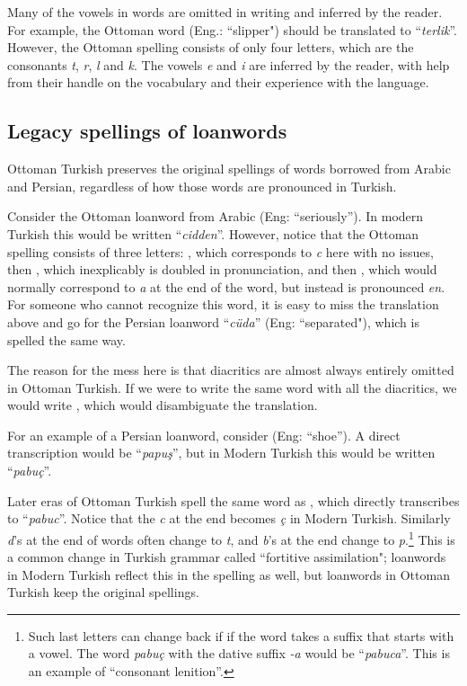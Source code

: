\documentclass[10pt,twocolumn]{article}
\theoremstyle{nonumberplain}
\newcommand{\otto}[1]{\RLE{\ottoman{}\Large{}#1}}
\newcommand{\word}[1]{``\emph{#1}''}
\begin{document}
Many of the vowels in words are omitted in writing and inferred by the reader.
For example, the Ottoman word \otto{ترلك} (Eng.: ``slipper") should be
translated to \word{terlik}.
However, the Ottoman spelling consists of only four letters, which are the
consonants \emph{t}, \emph{r}, \emph{l} and \emph{k}.
The vowels \emph{e} and \emph{i} are inferred by the reader, with help from
their handle on the vocabulary and their experience with the language.

\subsection{Legacy spellings of loanwords}

Ottoman Turkish preserves the original spellings of words borrowed from
Arabic and Persian, regardless of how those words are pronounced in Turkish.

Consider the Ottoman loanword from Arabic \otto{جدا} (Eng: ``seriously''). In
modern Turkish this would be written \word{cidden}. However, notice that the
Ottoman spelling consists of three letters: \otto{ج}, which corresponds to
\emph{c} here with no issues, then \otto{د}, which inexplicably is doubled in
pronunciation, and then \otto{ا}, which would normally correspond to
\emph{a} at the end of the word, but instead is pronounced \emph{en}.
For someone who cannot recognize this word, it is easy to miss the translation above and go for
the Persian loanword \word{cüda} (Eng: ``separated"), which is spelled the same way.

The reason for the mess here is that diacritics are almost always entirely omitted in Ottoman Turkish.
If we were to write the same word with all the diacritics, we would write
\otto{جِدًّا}, which would disambiguate the translation.

For an example of a Persian loanword, consider \otto{پاپوش} (Eng: ``shoe'').
A direct transcription would be \word{papuş},
but in Modern Turkish this would be written \word{pabuç}.

Later eras of Ottoman Turkish spell the same word as \otto{پابوج}, which
directly transcribes to \word{pabuc}. Notice that the \emph{c} at the end becomes
\emph{ç} in Modern Turkish. Similarly \emph{d}'s at the end of words
often change to \emph{t}, and \emph{b}'s at the end change to
\emph{p}.\footnote{Such last letters can change back if if the word takes a
suffix that starts with a vowel. The word \emph{pabuç} with the dative suffix
\emph{-a} would be \word{pabuca}. This is an example of ``consonant lenition''.}
This is a common change in Turkish grammar called
``fortitive assimilation"; loanwords in Modern Turkish reflect this in the
spelling as well, but loanwords in Ottoman Turkish keep the original spellings.
\end{document}
